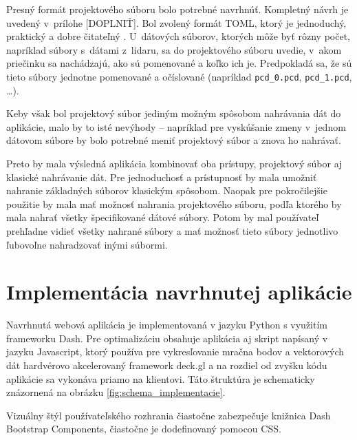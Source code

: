 Presný formát projektového súboru bolo potrebné navrhnúť. Kompletný návrh je uvedený v~prílohe [DOPLNIŤ]. Bol zvolený formát TOML, ktorý je jednoduchý, praktický a dobre čitateľný \cite{toml}. U~dátových súborov, ktorých môže byť rôzny počet, napríklad súbory s~dátami z~lidaru, sa do projektového súboru uvedie, v~akom priečinku sa nachádzajú, ako sú pomenované a koľko ich je. Predpokladá sa, že sú tieto súbory jednotne pomenované a očíslované (napríklad \texttt{pcd\_0.pcd}, \texttt{pcd\_1.pcd}, \dots).

Keby však bol projektový súbor jediným možným spôsobom nahrávania dát do aplikácie, malo by to isté nevýhody -- napríklad pre vyskúšanie zmeny v~jednom dátovom súbore by bolo potrebné meniť projektový súbor a znova ho nahrávať.

Preto by mala výsledná aplikácia kombinovať oba prístupy, projektový súbor aj klasické nahrávanie dát. Pre jednoduchosť a prístupnosť by mala umožniť nahranie základných súborov klasickým spôsobom. Naopak pre pokročilejšie použitie by mala mať možnosť nahrania projektového súboru, podľa ktorého by mala nahrať všetky špecifikované dátové súbory. Potom by mal používateľ prehľadne vidieť všetky nahrané súbory a mať možnosť tieto súbory jednotlivo ľubovoľne nahradzovať inými súbormi.

\chapter{Implementácia navrhnutej aplikácie}

Navrhnutá webová aplikácia je implementovaná v jazyku Python s využitím frameworku Dash. Pre optimalizáciu obsahuje aplikácia aj skript napísaný v jazyku Javascript, ktorý používa pre vykresľovanie mračna bodov a vektorových dát hardvérovo akcelerovaný framework deck.gl a na rozdiel od zvyšku kódu aplikácie sa vykonáva priamo na klientovi. Táto štruktúra je schematicky znázornená na obrázku \ref{fig:schema_implementacie}.

Vizuálny štýl používateľského rozhrania čiastočne zabezpečuje knižnica Dash Bootstrap Components, čiastočne je dodefinovaný pomocou CSS.

